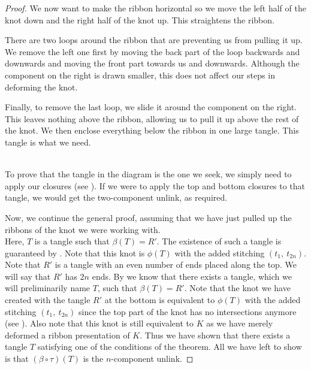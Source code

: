 \begin{paper}
\begin{proof}

We now want to make the ribbon horizontal so we move the left half of the knot
down and the right half of the knot up.
This straightens the ribbon.\\


There are two loops around the ribbon that are preventing us from pulling it up.
We remove the left one first by moving the back part of the loop backwards and
downwards and moving the front part towards us and downwards.
Although the component on the right is drawn smaller, this does not affect our
steps in deforming the knot.\\


Finally, to remove the last loop, we slide it around the component on the right.
This leaves nothing above the ribbon, allowing us to pull it up above the rest
of the knot.
We then enclose everything below the ribbon in one large tangle.
This tangle is what we need.

\\

To prove that the tangle in the diagram is the one we seek, we simply need to
apply our closures (see \figExplainFour).
If we were to apply the top and bottom closures to that tangle, we would get the
two-component unlink, as required.

Now, we continue the general proof, assuming that we have just pulled up the
ribbons of the knot we were working with.\\

{Here, $T$ is a tangle such that $\beta(T)=R'$.
The existence of such a tangle is guaranteed by \lemTangles.
Note that this knot is $\phi(T)$ with the added stitching $(t_1,~t_{2n})$.}\\

Note that $R'$ is a tangle with an even number of ends placed along the top.
We will say that $R'$ has $2n$ ends.
By \lemTangles we know that there exists a tangle, which we will preliminarily
name $T$, such that $\beta(T)=R'$.
Note that the knot we have created with the tangle $R'$ at the bottom is
equivalent to $\phi(T)$ with the added stitching $(t_1,~t_{2n})$ since the top
part of the knot has no intersections anymore (see \figFinal).
Also note that this knot is still equivalent to $K$ as we have merely deformed
a ribbon presentation of $K$.
Thus we have shown that there exists a tangle $T$ satisfying one of the
conditions of the theorem.
All we have left to show is that $(\beta\circ\tau)(T)$ is the $n$-component
unlink.


\end{proof}
\end{paper}
